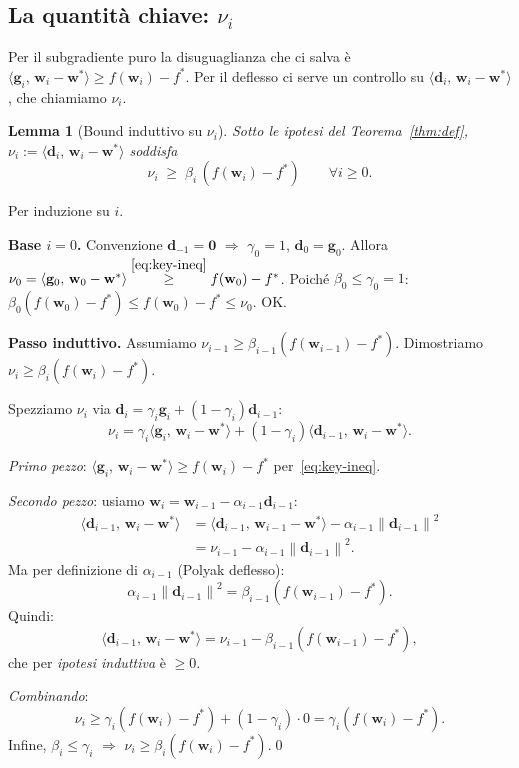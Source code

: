 \documentclass[11pt,a4paper]{article}
\newcommand{\norm}[1]{\left\|#1\right\|}
\newcommand{\inner}[2]{\langle #1,\,#2\rangle}
\newcommand{\bw}{\mathbf{w}}
\newcommand{\bg}{\mathbf{g}}
\newcommand{\bd}{\mathbf{d}}
\newcommand{\bzero}{\mathbf{0}}
\newtheorem{lemma}[theorem]{Lemma}
\theoremstyle{definition}
\begin{document}
\subsection{La quantità chiave: $\nu_i$}

Per il subgradiente puro la disuguaglianza che ci salva è $\inner{\bg_i}{\bw_i-\bw^*}\ge f(\bw_i)-f^*$. Per il deflesso ci serve un controllo su $\inner{\bd_i}{\bw_i-\bw^*}$, che chiamiamo $\nu_i$.

\begin{lemma}[Bound induttivo su $\nu_i$]
\label{lem:nu}
Sotto le ipotesi del Teorema~\ref{thm:def}, $\nu_i := \inner{\bd_i}{\bw_i-\bw^*}$ soddisfa
\begin{equation}
\label{eq:nu-bound}
\nu_i \;\ge\; \beta_i\,(f(\bw_i) - f^*) \qquad \forall i\ge 0.
\end{equation}
\end{lemma}

\begin{tcolorbox}[proofbox]
Per induzione su $i$.

\medskip
\textbf{Base $i=0$.} Convenzione $\bd_{-1}=\bzero$ $\Rightarrow$ $\gamma_0=1$, $\bd_0=\bg_0$. Allora
$\nu_0 = \inner{\bg_0}{\bw_0-\bw^*} \stackrel{\eqref{eq:key-ineq}}{\ge} f(\bw_0)-f^*$. Poiché $\beta_0\le\gamma_0=1$: $\beta_0(f(\bw_0)-f^*)\le f(\bw_0)-f^*\le\nu_0$. OK.

\medskip
\textbf{Passo induttivo.} Assumiamo $\nu_{i-1}\ge\beta_{i-1}(f(\bw_{i-1})-f^*)$. Dimostriamo $\nu_i \ge \beta_i(f(\bw_i)-f^*)$.

Spezziamo $\nu_i$ via $\bd_i = \gamma_i\bg_i + (1-\gamma_i)\bd_{i-1}$:
\[
\nu_i = \gamma_i\inner{\bg_i}{\bw_i-\bw^*} + (1-\gamma_i)\inner{\bd_{i-1}}{\bw_i-\bw^*}.
\]

\smallskip
\emph{Primo pezzo}: $\inner{\bg_i}{\bw_i-\bw^*}\ge f(\bw_i)-f^*$ per~\eqref{eq:key-ineq}.

\smallskip
\emph{Secondo pezzo}: usiamo $\bw_i = \bw_{i-1} - \alpha_{i-1}\bd_{i-1}$:
\begin{align*}
\inner{\bd_{i-1}}{\bw_i-\bw^*}
&= \inner{\bd_{i-1}}{\bw_{i-1}-\bw^*} - \alpha_{i-1}\norm{\bd_{i-1}}^2 \\
&= \nu_{i-1} - \alpha_{i-1}\norm{\bd_{i-1}}^2.
\end{align*}
Ma per definizione di $\alpha_{i-1}$ (Polyak deflesso):
\[
\alpha_{i-1}\norm{\bd_{i-1}}^2 = \beta_{i-1}(f(\bw_{i-1}) - f^*).
\]
Quindi:
\[
\inner{\bd_{i-1}}{\bw_i-\bw^*} = \nu_{i-1} - \beta_{i-1}(f(\bw_{i-1})-f^*),
\]
che per \emph{ipotesi induttiva} è $\ge 0$.

\smallskip
\emph{Combinando}:
\[
\nu_i \ge \gamma_i(f(\bw_i)-f^*) + (1-\gamma_i)\cdot 0 = \gamma_i(f(\bw_i)-f^*).
\]
Infine, $\beta_i\le\gamma_i$ $\Rightarrow$ $\nu_i\ge\beta_i(f(\bw_i)-f^*)$.\qed
\end{tcolorbox}
\end{document}
